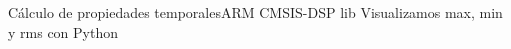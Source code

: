  \begin{frame}[t]{Cálculo de propiedades temporales}{ARM CMSIS-DSP lib}
    \handsonicon
    \footnotesize{Visualizamos max, min y rms con Python}
       \begin{columns}[t]
          \hspace{2pt}
          \begin{column}[t]{.4\textwidth}
             
          \end{column}
          \hspace{5pt}
          \vrule
          \hspace{5pt}
          \begin{column}[t]{.6\textwidth}
             
          \end{column}
       \end{columns}
 \end{frame}
\appendix

